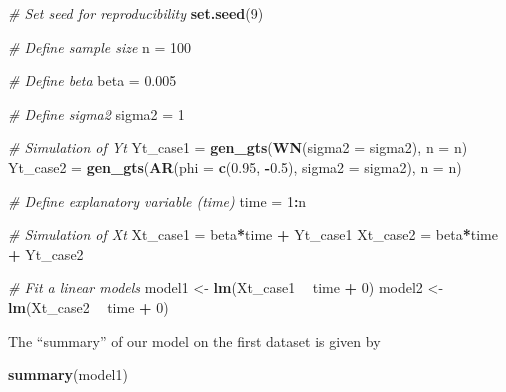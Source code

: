 \documentclass[]{book}
\newenvironment{Shaded}{\begin{snugshade}}{\end{snugshade}}
\newcommand{\KeywordTok}[1]{\textcolor[rgb]{0.13,0.29,0.53}{\textbf{#1}}}
\newcommand{\DataTypeTok}[1]{\textcolor[rgb]{0.13,0.29,0.53}{#1}}
\newcommand{\DecValTok}[1]{\textcolor[rgb]{0.00,0.00,0.81}{#1}}
\newcommand{\FloatTok}[1]{\textcolor[rgb]{0.00,0.00,0.81}{#1}}
\newcommand{\StringTok}[1]{\textcolor[rgb]{0.31,0.60,0.02}{#1}}
\newcommand{\CommentTok}[1]{\textcolor[rgb]{0.56,0.35,0.01}{\textit{#1}}}
\newcommand{\OperatorTok}[1]{\textcolor[rgb]{0.81,0.36,0.00}{\textbf{#1}}}
\newcommand{\NormalTok}[1]{#1}
\theoremstyle{definition}
\theoremstyle{definition}
\theoremstyle{definition}
\theoremstyle{remark}
\begin{document}
\begin{Shaded}
\begin{Highlighting}[]
\CommentTok{# Set seed for reproducibility}
\KeywordTok{set.seed}\NormalTok{(}\DecValTok{9}\NormalTok{)}

\CommentTok{# Define sample size}
\NormalTok{n =}\StringTok{ }\DecValTok{100}

\CommentTok{# Define beta}
\NormalTok{beta =}\StringTok{ }\FloatTok{0.005}

\CommentTok{# Define sigma2}
\NormalTok{sigma2 =}\StringTok{ }\DecValTok{1}

\CommentTok{# Simulation of Yt}
\NormalTok{Yt_case1 =}\StringTok{ }\KeywordTok{gen_gts}\NormalTok{(}\KeywordTok{WN}\NormalTok{(}\DataTypeTok{sigma2 =}\NormalTok{ sigma2), }\DataTypeTok{n =}\NormalTok{ n)}
\NormalTok{Yt_case2 =}\StringTok{ }\KeywordTok{gen_gts}\NormalTok{(}\KeywordTok{AR}\NormalTok{(}\DataTypeTok{phi =} \KeywordTok{c}\NormalTok{(}\FloatTok{0.95}\NormalTok{, }\OperatorTok{-}\FloatTok{0.5}\NormalTok{), }\DataTypeTok{sigma2 =}\NormalTok{ sigma2), }\DataTypeTok{n =}\NormalTok{ n)}

\CommentTok{# Define explanatory variable (time)}
\NormalTok{time =}\StringTok{ }\DecValTok{1}\OperatorTok{:}\NormalTok{n}

\CommentTok{# Simulation of Xt}
\NormalTok{Xt_case1 =}\StringTok{ }\NormalTok{beta}\OperatorTok{*}\NormalTok{time }\OperatorTok{+}\StringTok{ }\NormalTok{Yt_case1}
\NormalTok{Xt_case2 =}\StringTok{ }\NormalTok{beta}\OperatorTok{*}\NormalTok{time }\OperatorTok{+}\StringTok{ }\NormalTok{Yt_case2}

\CommentTok{# Fit a linear models}
\NormalTok{model1 <-}\StringTok{ }\KeywordTok{lm}\NormalTok{(Xt_case1 }\OperatorTok{~}\StringTok{ }\NormalTok{time }\OperatorTok{+}\StringTok{ }\DecValTok{0}\NormalTok{)}
\NormalTok{model2 <-}\StringTok{ }\KeywordTok{lm}\NormalTok{(Xt_case2 }\OperatorTok{~}\StringTok{ }\NormalTok{time }\OperatorTok{+}\StringTok{ }\DecValTok{0}\NormalTok{)}
\end{Highlighting}
\end{Shaded}

The ``summary'' of our model on the first dataset is given by

\begin{Shaded}
\begin{Highlighting}[]
\KeywordTok{summary}\NormalTok{(model1)}
\end{Highlighting}
\end{Shaded}
\end{document}
